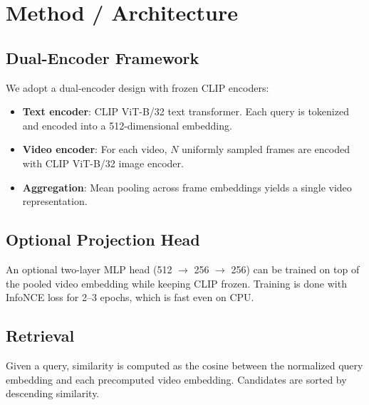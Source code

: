 \section{Method / Architecture}
\label{sec:method}

\subsection{Dual-Encoder Framework}
We adopt a dual-encoder design with frozen CLIP encoders:
\begin{itemize}
    \item \textbf{Text encoder}: CLIP ViT-B/32 text transformer. Each query is tokenized and encoded into a 512-dimensional embedding.
    \item \textbf{Video encoder}: For each video, $N$ uniformly sampled frames are encoded with CLIP ViT-B/32 image encoder.
    \item \textbf{Aggregation}: Mean pooling across frame embeddings yields a single video representation.
\end{itemize}

\subsection{Optional Projection Head}
An optional two-layer MLP head (512 $\to$ 256 $\to$ 256) can be trained on top of the pooled video embedding while keeping CLIP frozen. Training is done with InfoNCE loss for 2–3 epochs, which is fast even on CPU.

\subsection{Retrieval}
Given a query, similarity is computed as the cosine between the normalized query embedding and each precomputed video embedding. Candidates are sorted by descending similarity.
